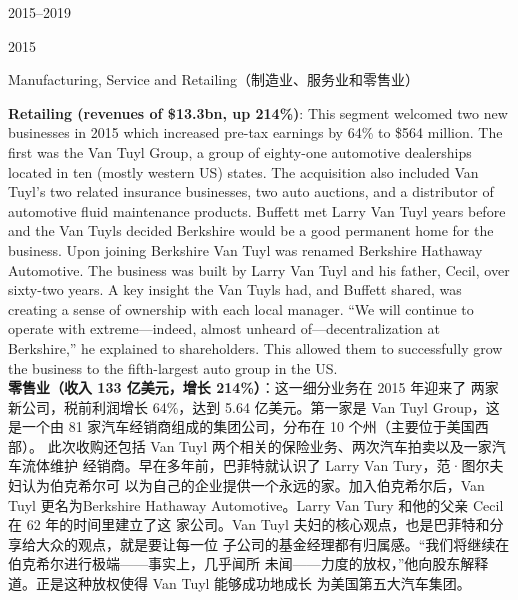 \begin{chapter}{2015--2019}
\begin{section}{2015}
\begin{subsection}{Manufacturing, Service and Retailing（制造业、服务业和零售业）}
\begin{verseparallel}
  {
    \textbf{Retailing (revenues of \$13.3bn, up 214\%)}: This segment welcomed
    two new businesses in 2015 which increased pre-tax earnings by 64\% to \$564
    million. The first was the Van Tuyl Group, a group of eighty-one automotive
    dealerships located in ten (mostly western US) states. The acquisition also
    included Van Tuyl’s two related insurance businesses, two auto auctions,
    and a distributor of automotive fluid maintenance products. Buffett met
    Larry Van Tuyl years before and the Van Tuyls decided Berkshire would be a
    good permanent home for the business. Upon joining Berkshire Van Tuyl was
    renamed Berkshire Hathaway Automotive. The business was built by Larry Van
    Tuyl and his father, Cecil, over sixty-two years. A key insight the Van
    Tuyls had, and Buffett shared, was creating a sense of ownership with each
    local manager. ``We will continue to operate with extreme—indeed, almost
    unheard of—decentralization at Berkshire,'' he explained to shareholders.
    This allowed them to successfully grow the business to the fifth-largest
    auto group in the US.  \\
  }
  {
    \textbf{零售业（收入 133 亿美元，增长 214\%）}：这一细分业务在 2015 年迎来了
    两家新公司，税前利润增长 64\%，达到 5.64 亿美元。第一家是 Van Tuyl Group，这
    是一个由 81 家汽车经销商组成的集团公司，分布在 10 个州（主要位于美国西部）。
    此次收购还包括 Van Tuyl 两个相关的保险业务、两次汽车拍卖以及一家汽车流体维护
    经销商。早在多年前，巴菲特就认识了 Larry Van Tury，范·图尔夫妇认为伯克希尔可
    以为自己的企业提供一个永远的家。加入伯克希尔后，Van Tuyl 更名为Berkshire
    Hathaway Automotive。Larry Van Tury 和他的父亲 Cecil 在 62 年的时间里建立了这
    家公司。Van Tuyl 夫妇的核心观点，也是巴菲特和分享给大众的观点，就是要让每一位
    子公司的基金经理都有归属感。“我们将继续在伯克希尔进行极端——事实上，几乎闻所
    未闻——力度的放权，”他向股东解释道。正是这种放权使得 Van Tuyl 能够成功地成长
    为美国第五大汽车集团。
  }
\end{verseparallel}


\end{subsection}
\end{section}
\end{chapter}
